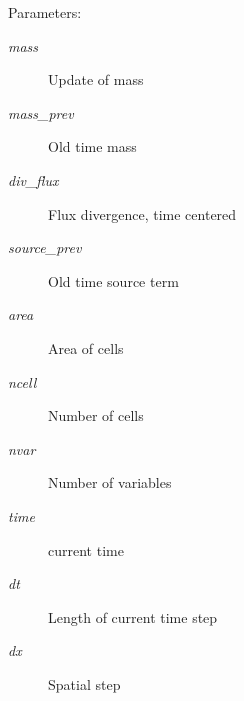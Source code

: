 \begin{Desc}
\item[Parameters:]
\begin{description}
\item[{\em mass}]Update of mass\item[{\em mass\_\-prev}]Old time mass\item[{\em div\_\-flux}]Flux divergence, time centered\item[{\em source\_\-prev}]Old time source term\item[{\em area}]Area of cells\item[{\em ncell}]Number of cells\item[{\em nvar}]Number of variables\item[{\em time}]current time\item[{\em dt}]Length of current time step\item[{\em dx}]Spatial step \end{description}
\end{Desc}

